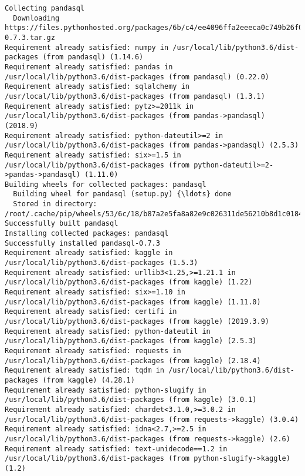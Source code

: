 \documentclass[11pt]{article}
\begin{document}
    \begin{Verbatim}[commandchars=\\\{\}]
Collecting pandasql
  Downloading https://files.pythonhosted.org/packages/6b/c4/ee4096ffa2eeeca0c749b26f0371bd26aa5c8b611c43de99a4f86d3de0a7/pandasql-0.7.3.tar.gz
Requirement already satisfied: numpy in /usr/local/lib/python3.6/dist-packages (from pandasql) (1.14.6)
Requirement already satisfied: pandas in /usr/local/lib/python3.6/dist-packages (from pandasql) (0.22.0)
Requirement already satisfied: sqlalchemy in /usr/local/lib/python3.6/dist-packages (from pandasql) (1.3.1)
Requirement already satisfied: pytz>=2011k in /usr/local/lib/python3.6/dist-packages (from pandas->pandasql) (2018.9)
Requirement already satisfied: python-dateutil>=2 in /usr/local/lib/python3.6/dist-packages (from pandas->pandasql) (2.5.3)
Requirement already satisfied: six>=1.5 in /usr/local/lib/python3.6/dist-packages (from python-dateutil>=2->pandas->pandasql) (1.11.0)
Building wheels for collected packages: pandasql
  Building wheel for pandasql (setup.py) {\ldots} done
  Stored in directory: /root/.cache/pip/wheels/53/6c/18/b87a2e5fa8a82e9c026311de56210b8d1c01846e18a9607fc9
Successfully built pandasql
Installing collected packages: pandasql
Successfully installed pandasql-0.7.3
Requirement already satisfied: kaggle in /usr/local/lib/python3.6/dist-packages (1.5.3)
Requirement already satisfied: urllib3<1.25,>=1.21.1 in /usr/local/lib/python3.6/dist-packages (from kaggle) (1.22)
Requirement already satisfied: six>=1.10 in /usr/local/lib/python3.6/dist-packages (from kaggle) (1.11.0)
Requirement already satisfied: certifi in /usr/local/lib/python3.6/dist-packages (from kaggle) (2019.3.9)
Requirement already satisfied: python-dateutil in /usr/local/lib/python3.6/dist-packages (from kaggle) (2.5.3)
Requirement already satisfied: requests in /usr/local/lib/python3.6/dist-packages (from kaggle) (2.18.4)
Requirement already satisfied: tqdm in /usr/local/lib/python3.6/dist-packages (from kaggle) (4.28.1)
Requirement already satisfied: python-slugify in /usr/local/lib/python3.6/dist-packages (from kaggle) (3.0.1)
Requirement already satisfied: chardet<3.1.0,>=3.0.2 in /usr/local/lib/python3.6/dist-packages (from requests->kaggle) (3.0.4)
Requirement already satisfied: idna<2.7,>=2.5 in /usr/local/lib/python3.6/dist-packages (from requests->kaggle) (2.6)
Requirement already satisfied: text-unidecode==1.2 in /usr/local/lib/python3.6/dist-packages (from python-slugify->kaggle) (1.2)

    \end{Verbatim}
\end{document}
